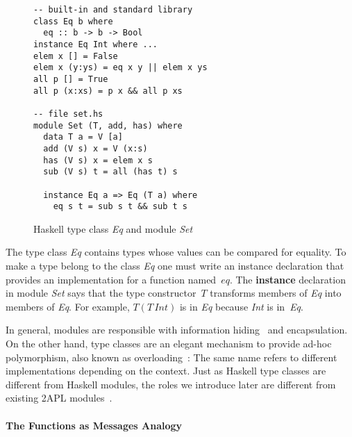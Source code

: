 \documentclass[a4paper,12pt,oneside,fleqn]{book} %
\begin{document}
\begin{figure}\footnotesize %
\begin{verbatim}
-- built-in and standard library
class Eq b where
  eq :: b -> b -> Bool
instance Eq Int where ...
elem x [] = False
elem x (y:ys) = eq x y || elem x ys
all p [] = True
all p (x:xs) = p x && all p xs

-- file set.hs
module Set (T, add, has) where
  data T a = V [a]
  add (V s) x = V (x:s)
  has (V s) x = elem x s
  sub (V s) t = all (has t) s

  instance Eq a => Eq (T a) where
    eq s t = sub s t && sub t s
\end{verbatim}
\caption{Haskell type class \textit{Eq} and module \textit{Set}}
\label{fig:haskell}
\end{figure} %


The type class \textit{Eq} contains types whose values can be compared for
equality. To make a type belong to the class \textit{Eq} one must write an
instance declaration that provides an implementation for a function
named~$eq$. The \textbf{instance} declaration in module \textit{Set} says
that the type constructor~$T$ transforms members of \textit{Eq} into
members of \textit{Eq}. For example, $T(T\,\mathit{Int})$ is in \textit{Eq}
because \textit{Int} is in~\textit{Eq}.

In general, modules are responsible with information
hiding~\cite{DBLP:journals/cacm/Parnas72a} and encapsulation.  On the other
hand, type classes are an elegant mechanism to provide ad-hoc polymorphism,
also known as overloading~\cite{DBLP:conf/popl/WadlerB89}: The same name
refers to different implementations depending on the context.  Just as
Haskell type classes are different from Haskell modules, the roles we
introduce later are different from existing 2APL
modules~\cite{dblp:conf/prima/dastanims08}.

\paragraph{The Functions as Messages Analogy} %
\end{document}

